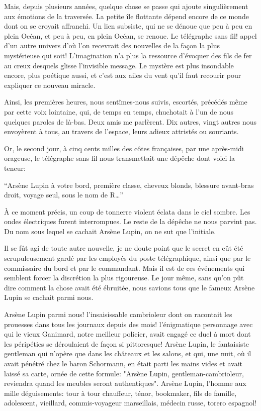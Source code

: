 \documentclass[12pt,a4paper]{book}
\begin{document}
Mais, depuis plusieurs années, quelque chose se passe qui ajoute singulièrement aux émotions de la traversée. La petite île flottante dépend encore de ce monde dont on se croyait affranchi. Un lien subsiste, qui ne se dénoue que peu à peu en plein Océan, et peu à peu, en plein Océan, se renoue. Le télégraphe sans fil! appel d’un autre univers d’où l’on recevrait des nouvelles de la façon la plus mystérieuse qui soit! L’imagination n’a plus la ressource d’évoquer des fils de fer au creux desquels glisse l’invisible message. Le mystère est plus insondable encore, plus poétique aussi, et c’est aux ailes du vent qu’il faut recourir pour expliquer ce nouveau miracle.

Ainsi, les premières heures, nous sentîmes-nous suivis, escortés, précédés même par cette voix lointaine, qui, de temps en temps, chuchotait à l’un de nous quelques paroles de là-bas. Deux amis me parlèrent. Dix autres, vingt autres nous envoyèrent à tous, au travers de l’espace, leurs adieux attristés ou souriants.

Or, le second jour, à cinq cents milles des côtes françaises, par une après-midi orageuse, le télégraphe sans fil nous transmettait une dépêche dont voici la teneur:

\enquote{Arsène Lupin à votre bord, première classe, cheveux blonds, blessure avant-bras droit, voyage seul, sous le nom de R…}

À ce moment précis, un coup de tonnerre violent éclata dans le ciel sombre. Les ondes électriques furent interrompues. Le reste de la dépêche ne nous parvint pas. Du nom sous lequel se cachait Arsène Lupin, on ne sut que l’initiale.

Il se fût agi de toute autre nouvelle, je ne doute point que le secret en eût été scrupuleusement gardé par les employés du poste télégraphique, ainsi que par le commissaire du bord et par le commandant. Mais il est de ces événements qui semblent forcer la discrétion la plus rigoureuse. Le jour même, sans qu’on pût dire comment la chose avait été ébruitée, nous savions tous que le fameux Arsène Lupin se cachait parmi nous.

Arsène Lupin parmi nous! l’insaisissable cambrioleur dont on racontait les prouesses dans tous les journaux depuis des mois! l’énigmatique personnage avec qui le vieux Ganimard, notre meilleur policier, avait engagé ce duel à mort dont les péripéties se déroulaient de façon si pittoresque! Arsène Lupin, le fantaisiste gentleman qui n’opère que dans les châteaux et les salons, et qui, une nuit, où il avait pénétré chez le baron Schormann, en était parti les mains vides et avait laissé sa carte, ornée de cette formule: "Arsène Lupin, gentleman-cambrioleur, reviendra quand les meubles seront authentiques". Arsène Lupin, l’homme aux mille déguisements: tour à tour chauffeur, ténor, bookmaker, fils de famille, adolescent, vieillard, commis-voyageur marseillais, médecin russe, torero espagnol!
\end{document}
